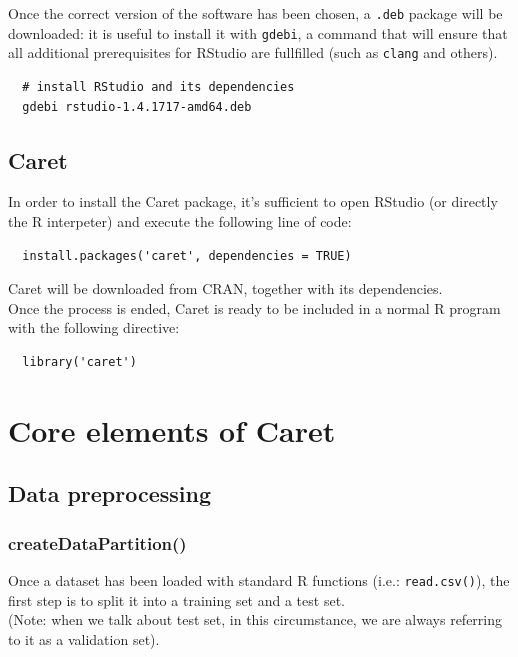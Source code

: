 \documentclass{article}
\begin{document}
Once the correct version of the software has been chosen, a \texttt{.deb} package will be downloaded: it is useful to install it with \texttt{gdebi}, a command that will ensure that all additional prerequisites for RStudio are fullfilled (such as \texttt{clang} and others).\\

\begin{lstlisting}
  # install RStudio and its dependencies
  gdebi rstudio-1.4.1717-amd64.deb
\end{lstlisting}

\pagebreak

\subsection{Caret}
In order to install the Caret package, it's sufficient to open RStudio (or directly the R interpeter) and execute the following line of code:\\

\begin{lstlisting}
  install.packages('caret', dependencies = TRUE)
\end{lstlisting}

Caret will be downloaded from CRAN, together with its dependencies.\\

Once the process is ended, Caret is ready to be included in a normal R program with the following directive:\\

\begin{lstlisting}
  library('caret')
\end{lstlisting}

\pagebreak

\section{Core elements of Caret}
\subsection{Data preprocessing}
\subsubsection{createDataPartition()}
Once a dataset has been loaded with standard R functions (i.e.: \texttt{read.csv()}), the first step is to split it into a training set and a test set.\\
(Note: when we talk about test set, in this circumstance, we are always referring to it as a validation set).\\
\end{document}
